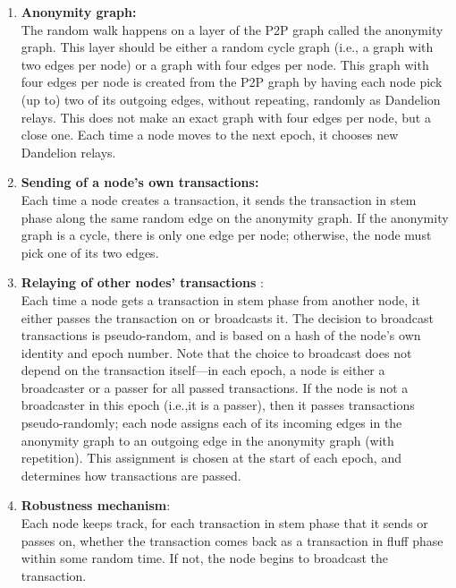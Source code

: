 \begin{enumerate}
	\item \textbf{Anonymity graph:}\\ The random walk happens on a layer of the P2P graph called the anonymity graph. This layer should be either a random cycle graph (i.e., a graph with two edges per node) or a graph with four edges per node. This graph with four edges per node is created from the P2P graph by having each node pick (up to) two of its outgoing edges, without repeating, randomly as Dandelion relays. This does not make an exact graph with four edges per node, but a close one. Each time a node moves to the next epoch, it chooses new Dandelion relays.
	\item \textbf{Sending of a node’s own transactions:}\\ Each time a node creates a transaction, it sends the transaction in stem phase along the same random edge on the anonymity graph. If the anonymity graph is a cycle, there is only one edge per node; otherwise, the node must pick one of its two edges.
	\item \textbf{Relaying of other nodes’ transactions} : \\  Each time a node gets a transaction in stem phase from another node, it either passes the transaction on or broadcasts it. The decision to broadcast transactions is pseudo-random, and is based on a hash of the node’s own identity and epoch number. Note that the choice to broadcast does not depend on the transaction itself—in each epoch, a node is either a broadcaster or a passer for all passed transactions. If the node is not a broadcaster in this epoch (i.e.,it is a passer), then it passes transactions pseudo-randomly; each node assigns each of its incoming edges in the anonymity graph to an outgoing edge in the anonymity graph (with repetition). This assignment is chosen at the start of each epoch, and determines how transactions are passed.
	\item \textbf{Robustness mechanism}:\\ Each node keeps track, for each transaction in stem phase that it sends or passes on, whether the transaction comes back as a transaction in fluff phase within some random time. If not, the node begins to broadcast the transaction.
\end{enumerate}